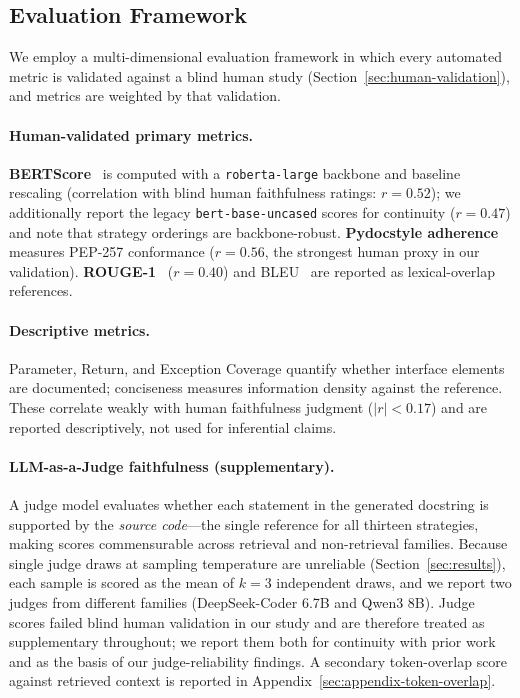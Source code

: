 \documentclass[pdflatex,sn-mathphys-ay]{sn-jnl}%
\theoremstyle{thmstyleone}%
\theoremstyle{thmstyletwo}%
\theoremstyle{thmstylethree}%
\begin{document}
{\color{blue}
\subsection{Evaluation Framework}
\label{sec:eval-design}
We employ a multi-dimensional evaluation framework in which every automated metric is validated against a blind human study (Section~\ref{sec:human-validation}), and metrics are weighted by that validation.
\paragraph{Human-validated primary metrics.} \textbf{BERTScore}~\cite{BERT} is computed with a \texttt{roberta-large} backbone and baseline rescaling (correlation with blind human faithfulness ratings: $r=0.52$); we additionally report the legacy \texttt{bert-base-uncased} scores for continuity ($r=0.47$) and note that strategy orderings are backbone-robust. \textbf{Pydocstyle adherence} measures PEP-257 conformance ($r=0.56$, the strongest human proxy in our validation). \textbf{ROUGE-1}~\cite{rouge} ($r=0.40$) and BLEU~\cite{BLEU} are reported as lexical-overlap references.
\paragraph{Descriptive metrics.} Parameter, Return, and Exception Coverage quantify whether interface elements are documented; conciseness measures information density against the reference. These correlate weakly with human faithfulness judgment ($|r|<0.17$) and are reported descriptively, not used for inferential claims.
\paragraph{LLM-as-a-Judge faithfulness (supplementary).} A judge model evaluates whether each statement in the generated docstring is supported by the \emph{source code}---the single reference for all thirteen strategies, making scores commensurable across retrieval and non-retrieval families. Because single judge draws at sampling temperature are unreliable (Section~\ref{sec:results}), each sample is scored as the mean of $k{=}3$ independent draws, and we report two judges from different families (DeepSeek-Coder 6.7B and Qwen3 8B). Judge scores failed blind human validation in our study and are therefore treated as supplementary throughout; we report them both for continuity with prior work and as the basis of our judge-reliability findings. A secondary token-overlap score against retrieved context is reported in Appendix~\ref{sec:appendix-token-overlap}.

}
\end{document}
